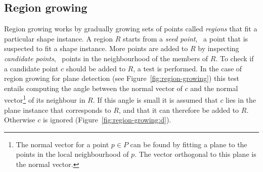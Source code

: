 

\subsection{Region growing}
\label{sec:regiongrowing}
Region growing works by gradually growing sets of points called \emph{regions} that fit a particular shape instance.
A region $R$ starts from a \emph{seed point}, \ie\ a point that is suspected to fit a shape instance.
More points are added to $R$ by inspecting \emph{candidate points}, \ie\ points in the neighbourhood of the members of $R$.
To check if a candidate point $c$ should be added to $R$, a test is performed.
In the case of region growing for plane detection (see Figure~\ref{fig:region-growing}) this test entails computing the angle between the normal vector of $c$ and the normal vector\footnote{The normal vector for a point $p\in P$ can be found by fitting a plane to the points in the local neighbourhood of $p$. The vector orthogonal to this plane is the normal vector.} of its neighbour in $R$.
If this angle is small it is assumed that $c$ lies in the plane instance that corresponds to $R$, and that it can therefore be added to $R$.
Otherwise $c$ is ignored (Figure~\ref{fig:region-growing:d}).
